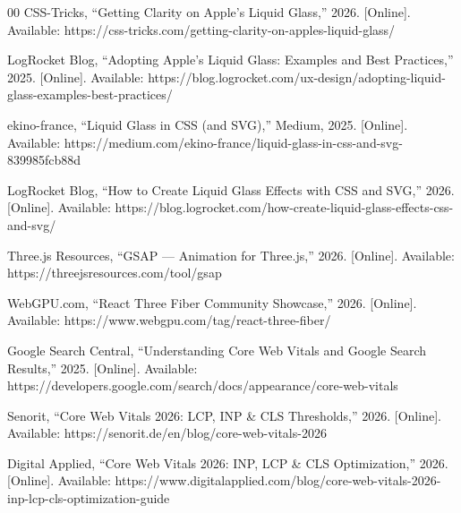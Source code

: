 \documentclass[conference]{IEEEtran}
\begin{document}
\begin{thebibliography}{00}
 CSS-Tricks, ``Getting Clarity on Apple's Liquid Glass,'' 2026. [Online]. Available: https://css-tricks.com/getting-clarity-on-apples-liquid-glass/

 LogRocket Blog, ``Adopting Apple's Liquid Glass: Examples and Best Practices,'' 2025. [Online]. Available: https://blog.logrocket.com/ux-design/adopting-liquid-glass-examples-best-practices/

 ekino-france, ``Liquid Glass in CSS (and SVG),'' Medium, 2025. [Online]. Available: https://medium.com/ekino-france/liquid-glass-in-css-and-svg-839985fcb88d

 LogRocket Blog, ``How to Create Liquid Glass Effects with CSS and SVG,'' 2026. [Online]. Available: https://blog.logrocket.com/how-create-liquid-glass-effects-css-and-svg/

 Three.js Resources, ``GSAP --- Animation for Three.js,'' 2026. [Online]. Available: https://threejsresources.com/tool/gsap

 WebGPU.com, ``React Three Fiber Community Showcase,'' 2026. [Online]. Available: https://www.webgpu.com/tag/react-three-fiber/

 Google Search Central, ``Understanding Core Web Vitals and Google Search Results,'' 2025. [Online]. Available: https://developers.google.com/search/docs/appearance/core-web-vitals

 Senorit, ``Core Web Vitals 2026: LCP, INP \& CLS Thresholds,'' 2026. [Online]. Available: https://senorit.de/en/blog/core-web-vitals-2026

 Digital Applied, ``Core Web Vitals 2026: INP, LCP \& CLS Optimization,'' 2026. [Online]. Available: https://www.digitalapplied.com/blog/core-web-vitals-2026-inp-lcp-cls-optimization-guide

\end{thebibliography}
\end{document}
